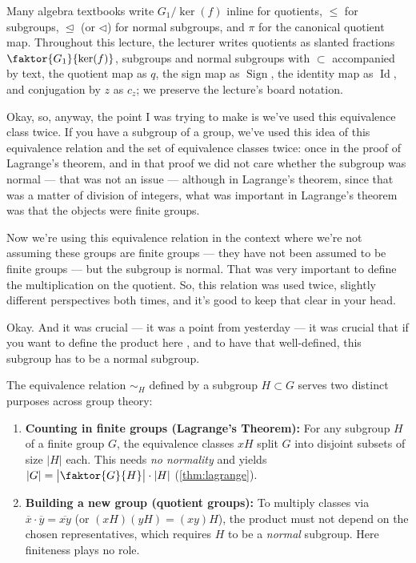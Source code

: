 \begin{aiNote}
Many algebra textbooks write $G_1 / \ker(f)$ inline for quotients, $\le$ for subgroups, $\trianglelefteq$ (or $\triangleleft$) for normal subgroups, and $\pi$ for the canonical quotient map. Throughout this lecture, the lecturer writes quotients as slanted fractions $\faktor{G_1}{\ker(f)}$, subgroups and normal subgroups with $\subset$ accompanied by text, the quotient map as $q$, the sign map as $\operatorname{Sign}$, the identity map as $\operatorname{Id}$, and conjugation by $z$ as $c_z$; we preserve the lecture's board notation.
\end{aiNote}

\begin{speech}[00:02:40 - 00:03:49]
Okay, so, anyway, the point I was trying to make is we've used this equivalence class twice. If you have a subgroup of a group, we've used this idea of this equivalence relation and the set of equivalence classes twice: once in the proof of Lagrange's theorem, and in that proof we did not care whether the subgroup was normal --- that was not an issue --- although in Lagrange's theorem, since that was a matter of division of integers, what was important in Lagrange's theorem was that the objects were finite groups.

Now we're using this equivalence relation in the context where we're not assuming these groups are finite groups --- they have not been assumed to be finite groups --- but the subgroup is normal. That was very important to define the multiplication on the quotient. So, this relation was used twice, slightly different perspectives both times, and it's good to keep that clear in your head.

Okay. And it was crucial --- it was a point from yesterday --- it was crucial that if you want to define the product here , and to have that well-defined, this subgroup  has to be a normal subgroup.
\end{speech}

\begin{insight}
The equivalence relation $\sim_H$ defined by a subgroup $H \subset G$ serves two distinct purposes across group theory:
\begin{enumerate}[label=\textbf{(\arabic*)}]
    \item \textbf{Counting in finite groups (Lagrange's Theorem):} For any subgroup $H$ of a finite group $G$, the equivalence classes $xH$ split $G$ into disjoint subsets of size $|H|$ each. This needs \emph{no normality} and yields $|G| = \bigl|\faktor{G}{H}\bigr| \cdot |H|$ (\cref{thm:lagrange}).
    \item \textbf{Building a new group (quotient groups):} To multiply classes via $\overline{x} \cdot \overline{y} = \overline{xy}$ (or $(xH)(yH) = (xy)H$), the product must not depend on the chosen representatives, which requires $H$ to be a \emph{normal} subgroup. Here finiteness plays no role.
\end{enumerate}
\end{insight}

